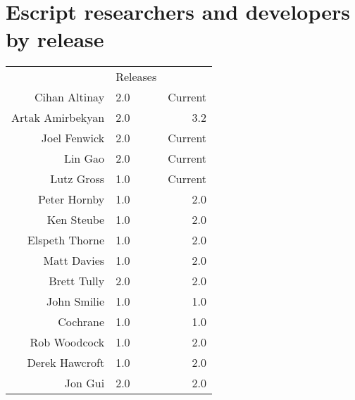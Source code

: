 
\chapter{Escript researchers and developers by release}

\begin{center}
\begin{tabular}{r|lr|}
& Releases\\ \cline{2-3}
Cihan Altinay & 2.0 & Current \\
Artak Amirbekyan & 2.0 & 3.2 \\
Joel Fenwick & 2.0 & Current \\
Lin Gao & 2.0 & Current \\
Lutz Gross & 1.0 & Current \\
Peter Hornby & 1.0 & 2.0 \\
Ken Steube & 1.0 & 2.0 \\
Elspeth Thorne & 1.0 & 2.0 \\
Matt Davies & 1.0 & 2.0 \\
Brett Tully & 2.0 & 2.0 \\
John Smilie & 1.0 & 1.0 \\
Cochrane & 1.0 & 1.0 \\
Rob Woodcock & 1.0 & 2.0 \\
Derek Hawcroft & 1.0 & 2.0 \\
Jon Gui & 2.0 & 2.0 \\
\cline{2-3}
\end{tabular}
\end{center}

